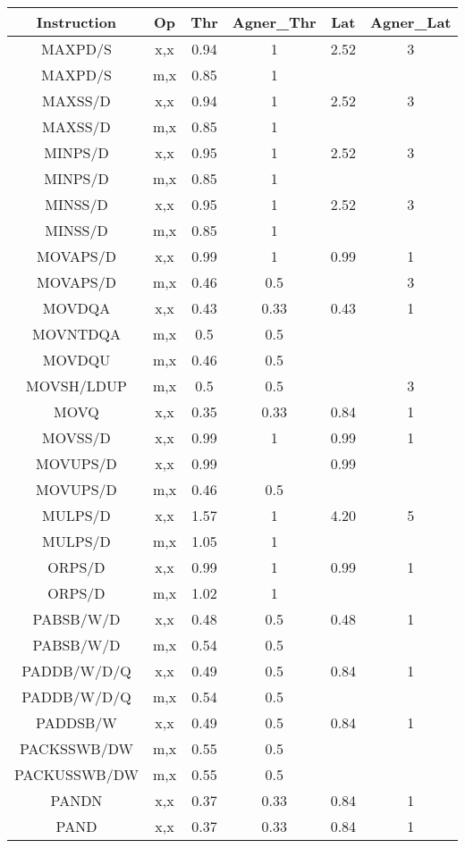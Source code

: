 \documentclass[11pt,a4paper]{article}
\begin{document}
\begin{center}
\begin{tabular}{|c|c|c|c|c|c|}
\hline
Instruction & Op & Thr & Agner\_Thr & Lat & Agner\_Lat \\
\hline
MAXPD/S & x,x & 0.94 & 1 & 2.52 & 3 \\
MAXPD/S & m,x & 0.85 & 1 &  &  \\
MAXSS/D & x,x & 0.94 & 1 & 2.52 & 3 \\
MAXSS/D & m,x & 0.85 & 1 &  &  \\
MINPS/D & x,x & 0.95 & 1 & 2.52 & 3 \\
MINPS/D & m,x & 0.85 & 1 &  &  \\
MINSS/D & x,x & 0.95 & 1 & 2.52 & 3 \\
MINSS/D & m,x & 0.85 & 1 &  &  \\
MOVAPS/D & x,x & 0.99 & 1 & 0.99 & 1 \\
MOVAPS/D & m,x & 0.46 & 0.5 &  & 3 \\
MOVDQA & x,x & 0.43 & 0.33 & 0.43 & 1  \\
MOVNTDQA & m,x & 0.5 & 0.5 &  &   \\
MOVDQU & m,x & 0.46 & 0.5 &  &  \\
MOVSH/LDUP & m,x & 0.5 & 0.5 &  & 3 \\
MOVQ & x,x & 0.35 & 0.33 & 0.84 & 1 \\
MOVSS/D & x,x & 0.99 & 1 & 0.99 & 1 \\
MOVUPS/D & x,x & 0.99 &  & 0.99 &  \\
MOVUPS/D & m,x & 0.46 & 0.5 &  &  \\
MULPS/D & x,x & 1.57 & 1 & 4.20 & 5 \\
MULPS/D & m,x & 1.05 & 1 &  &  \\
ORPS/D & x,x & 0.99 & 1 & 0.99 & 1 \\
ORPS/D & m,x & 1.02 & 1 &  &  \\
PABSB/W/D & x,x & 0.48 & 0.5 & 0.48 & 1 \\
PABSB/W/D & m,x & 0.54 & 0.5 &  &  \\
PADDB/W/D/Q & x,x & 0.49 & 0.5 & 0.84 & 1 \\
PADDB/W/D/Q & m,x & 0.54 & 0.5 &  &  \\
PADDSB/W & x,x & 0.49 & 0.5 & 0.84 & 1 \\
PACKSSWB/DW & m,x & 0.55 & 0.5 &  &   \\
PACKUSSWB/DW & m,x & 0.55 & 0.5 &  &  \\
PANDN & x,x & 0.37 & 0.33 & 0.84 & 1 \\
PAND & x,x & 0.37 & 0.33 & 0.84 & 1 \\

\end{tabular}
\end{center}
\end{document}
